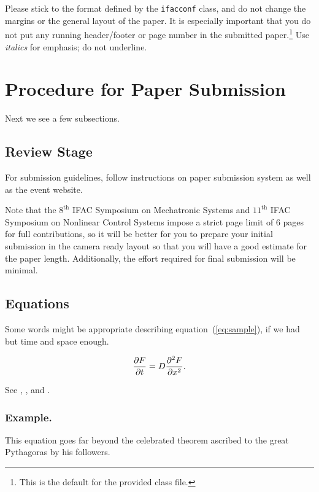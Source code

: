 \documentclass{ifacconf}
\begin{document}
Please stick to the format defined by the \texttt{ifacconf} class, and do not change the margins or the general layout of the paper. It is especially important that you do not put any running header/footer or page number in the submitted paper.\footnote{
This is the default for the provided class file.}
Use \emph{italics} for emphasis; do not underline.

\section{Procedure for Paper Submission}

Next we see a few subsections.

\subsection{Review Stage}

For submission guidelines, follow instructions on paper submission
system as well as the event website.

Note that the $8^{\mathrm{th}}$ IFAC Symposium on Mechatronic Systems and $11^{\mathrm{th}}$ IFAC Symposium on Nonlinear Control Systems impose a strict page limit of 6 pages for full contributions, so it will be better for you to prepare your initial submission in the camera ready layout so that you will have a good estimate for the paper length. Additionally, the effort required for final submission will be minimal.

\subsection{Equations}

Some words might be appropriate describing equation~(\ref{eq:sample}), if 
we had but time and space enough. 

\begin{equation} \label{eq:sample}
{{\partial F}\over {\partial t}} = D{{\partial^2 F}\over {\partial x^2}}.
\end{equation}

See \cite{Abl:56}, \cite{AbTaRu:54}, \cite{Keo:58} and \cite{Pow:85}.

\subsubsection{Example.} This equation goes far beyond the
celebrated theorem ascribed to the great Pythagoras by his followers.
\end{document}
